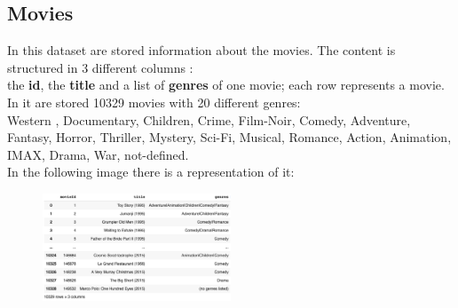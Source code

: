 \documentclass{article}
\begin{document}
\subsection{Movies}
In this dataset are stored information about the movies. The content is structured in 3 different columns : \\
the \textbf{id}, the \textbf{title} and a list of \textbf{genres} of one movie; each row represents a movie. In it are stored 10329 movies with 20 different genres:\\ Western , Documentary, Children, Crime, Film-Noir, Comedy, Adventure, Fantasy, Horror, Thriller, Mystery, Sci-Fi, Musical, Romance, Action, Animation, IMAX, Drama, War, not-defined. \\
In the following image there is a representation of it:
\begin{figure}[ht]
      \begin{center}
            \includegraphics[width=0.5\textwidth]{images/movies data.png}
      \end{center}
\end{figure}
\end{document}
